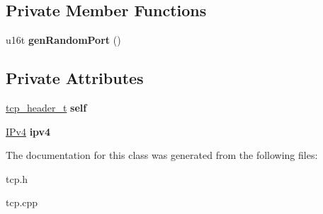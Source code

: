 \subsection*{Private Member Functions}
\begin{DoxyCompactItemize}
\item 
\mbox{\label{classTcp_a5f8fee77a1e98bbf3e38419e14cd2b20}} 
u16t {\bfseries gen\+Random\+Port} ()
\end{DoxyCompactItemize}
\subsection*{Private Attributes}
\begin{DoxyCompactItemize}
\item 
\mbox{\label{classTcp_a8d534d9756bb2da25562007ea4f7d892}} 
\mbox{\hyperlink{structtcp__header__t}{tcp\+\_\+header\+\_\+t}} {\bfseries self}
\item 
\mbox{\label{classTcp_af11f1b485c7082948b0c97d4e1fd1fb5}} 
\mbox{\hyperlink{classIPv4}{I\+Pv4}} {\bfseries ipv4}
\end{DoxyCompactItemize}


The documentation for this class was generated from the following files\+:\begin{DoxyCompactItemize}
\item 
tcp.\+h\item 
tcp.\+cpp\end{DoxyCompactItemize}
